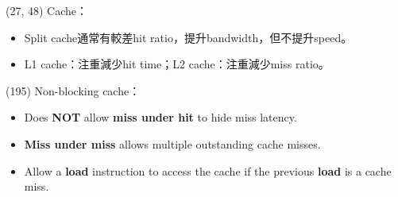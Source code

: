 \item \begin{theorem}{(27, 48)} Cache：\begin{itemize}
        \item Split cache通常有較差hit ratio，提升bandwidth，但不提升speed。
        \item L1 cache：注重減少hit time；L2 cache：注重減少miss ratio。
    \end{itemize}
\end{theorem}

\item \begin{theorem}{(195)} Non-blocking cache： \begin{itemize}
        \item Does \textbf{NOT} allow \textbf{miss under hit} to hide miss latency. 
        \item \textbf{Miss under miss} allows multiple outstanding cache misses.
        \item Allow a \textbf{load} instruction to access the cache if the previous \textbf{load} is a cache miss.
    \end{itemize}
\end{theorem}
